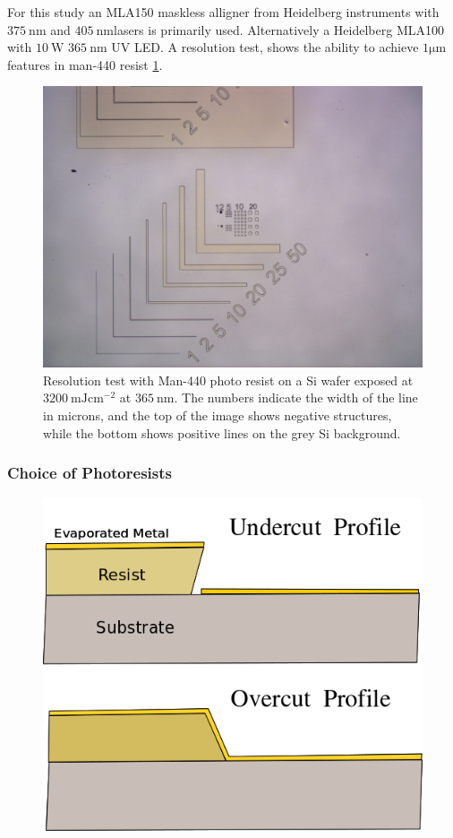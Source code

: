 For this study an MLA150 maskless alligner from Heidelberg instruments with $\SI{375}{\nm}$ and $\SI{405}{\nm}$lasers is primarily used. Alternatively a Heidelberg MLA100 with $\SI{10}{\watt}$ $\SI{365}{\nm}$ UV LED. A resolution test, shows the ability to achieve $ 1 \si{\micro \meter}$ features in man-440 resist \ref{fig:resolution_test}. 

\begin{figure}[!htb]
    \centering
    \includegraphics[width=\textwidth]{fig/Results/resolution_test.jpg}
    \caption{Resolution test with Man-440 photo resist on a Si wafer exposed at  $\SI{3200}{\milli \joule \cm^{-2}}$ at $\SI{365}{\nm}$. The numbers indicate the width of the line in microns, and the top of the image shows negative structures, while the bottom shows positive lines on the grey Si background.}
    \label{fig:resolution_test}
\end{figure}


\subsubsection{Choice of Photoresists}

 \begin{figure}[!htb]
    \centering
    \includegraphics[width=.5\textwidth]{fig/Methods/resist_profile_2.png}
    \caption{}
    \label{fig:resist_profile}
\end{figure}

